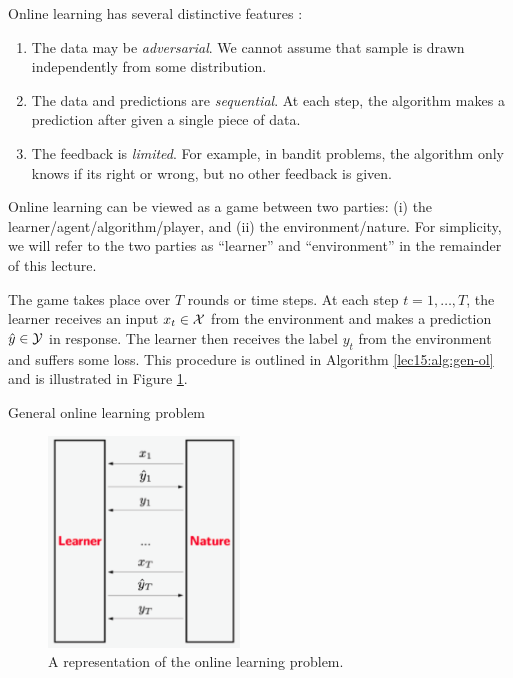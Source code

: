 Online learning has several distinctive features \cite{percynotes}:
\begin{enumerate}
\item The data may be \textit{adversarial}. We cannot assume that sample is drawn independently from some distribution.    
\item The data and predictions are \textit{sequential}. At each step, the algorithm makes a prediction after given a single piece of data.
\item The feedback is \textit{limited}. For example, in bandit problems, the algorithm only knows if its right or wrong, but no other feedback is given. 
\end{enumerate}


Online learning can be viewed as a game between two parties: (i) the learner/agent/algorithm/player, and (ii) the environment/nature. For simplicity, we will refer to the two parties as ``learner'' and ``environment'' in the remainder of this lecture.

The game takes place over $T$ rounds or time steps. At each step $t = 1, \dots, T$, the learner receives an input $x_t \in \mathcal X$ from the environment and makes a prediction $\hat{y} \in \mathcal Y$ in response. The learner then receives the label $y_t$ from the environment and suffers some loss. This procedure is outlined in Algorithm \ref{lec15:alg:gen-ol} and is illustrated in Figure \ref{lec15:fig:OLgame}.

    \begin{algorithm}[h]\label{lec15:alg:gen-ol}
        \caption{General online learning problem}
    \end{algorithm}

\begin{figure}[ht]
    \centering
    \includegraphics[width=2in]{figures/OLupdated.png}
    \caption{A representation of the online learning problem.}
    \label{lec15:fig:OLgame}
\end{figure}

